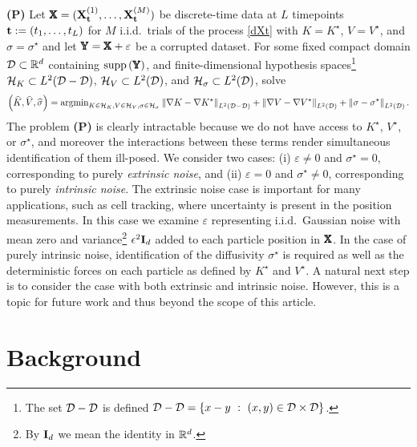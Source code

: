 \documentclass[english,reqno]{amsart}
\begin{document}
\noindent \textbf{(P)} Let $\pmb{\mathbb{X}} = (\mathbf{X}_{\mathbf{t}}^{(1)}, \dots, \mathbf{X}_{\mathbf{t}}^{(M)})$ be discrete-time data at $L$ timepoints $\mathbf{t} := (t_1,\dots,t_L)$ for $M$ i.i.d.\ trials of the process \eqref{dXt} with $K = K^\star$, $V=V^\star$, and $\sigma=\sigma^\star$ and let $\pmb{\mathbb{Y}} = \pmb{\mathbb{X}}+\varepsilon$ be a corrupted dataset. For some fixed compact domain ${\mathcal{D}} \subset \mathbb{R}^d$ containing $\text{supp}\left(\pmb{\mathbb{Y}}\right)$, and finite-dimensional hypothesis spaces\footnote{The set ${\mathcal{D}}-{\mathcal{D}}$ is defined
${\mathcal{D}}-{\mathcal{D}} =\{x-y\ :\ (x,y)\in {\mathcal{D}}\times {\mathcal{D}}\}$.} ${\mathcal{H}}_K\subset L^2({\mathcal{D}}-{\mathcal{D}})$, ${\mathcal{H}}_V\subset L^2({\mathcal{D}})$, and ${\mathcal{H}}_\sigma\subset L^2({\mathcal{D}})$,
solve 
\[\left(\widehat{K},\widehat{V}, \widehat{\sigma}\right)=\text{argmin}_{K\in {\mathcal{H}}_K,V\in {\mathcal{H}}_V,\sigma\in {\mathcal{H}}_\sigma} \left\Vert {\nabla K-\nabla K^\star} \right\Vert_{L^2({\mathcal{D}}-{\mathcal{D}})}+\left\Vert {\nabla V-\nabla  V^\star} \right\Vert_{L^2({\mathcal{D}})}+\left\Vert {\sigma-\sigma^\star} \right\Vert_{L^2({\mathcal{D}})}.\]
The problem \textbf{(P)} is clearly intractable because we do not have access to $K^\star$, $V^\star$, or $\sigma^\star$, and moreover the interactions between these terms render simultaneous identification of them ill-posed. We consider two cases: (i) $\varepsilon \neq 0$ and $\sigma^\star=0$, corresponding to purely {\it extrinsic noise}, and (ii) $\varepsilon=0$ and $\sigma^\star\neq 0$, corresponding to purely {\it intrinsic noise}. The extrinsic noise case is important for many applications, such as cell tracking, where uncertainty is present in the position measurements. In this case we examine $\varepsilon$ representing i.i.d.\ Gaussian noise with mean zero and variance\footnote{By $\mathbf{I}_d$ we mean the identity in $\mathbb{R}^d$.} $\epsilon^2\mathbf{I}_d$ added to each particle position in $\pmb{\mathbb{X}}$. In the case of purely intrinsic noise, identification of the diffusivity $\sigma^\star$ is required as well as the deterministic forces on each particle as defined by $K^\star$ and $V^\star$.  A natural next step is to consider the case with both extrinsic and intrinsic noise.  However, this is a topic for future work and thus beyond the scope of this article.

\section{Background}
\end{document}
